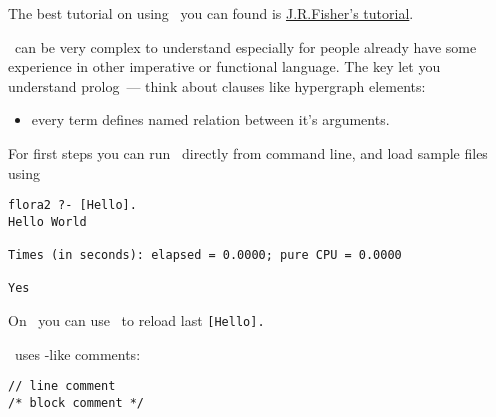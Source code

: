 \secdown

The best tutorial on using \prolog\ you can found is
\href{https://www.cpp.edu/~jrfisher/www/prolog_tutorial/contents.html}{J.R.Fisher's
tutorial}.

\bigskip
\prolog\ can be very complex to understand especially for people already have
some experience in other imperative or functional language. The key let you
understand prolog\ --- think about clauses like hypergraph elements:
\begin{itemize}
  \item 
every term defines named relation between it's arguments.
\end{itemize}

\clearpage
For first steps you can run \flora\ directly from command line, and load sample
files using



\begin{verbatim}
flora2 ?- [Hello].
Hello World

Times (in seconds): elapsed = 0.0000; pure CPU = 0.0000

Yes
\end{verbatim}

On \win\ you can use \keys{\arrowkeyup}\ to reload last \verb$[Hello].$



\flora\ uses \cpp-like comments:
\begin{verbatim}
// line comment
/* block comment */
\end{verbatim}

\secup
